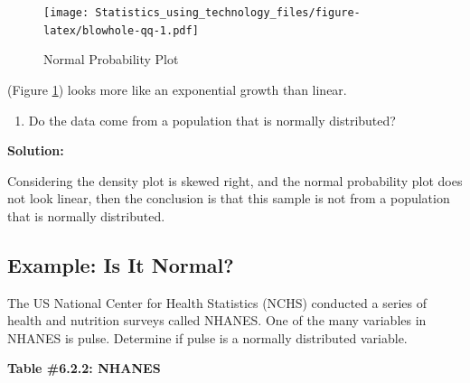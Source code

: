 \documentclass[
]{book}
\providecommand{\tightlist}{%
  \setlength{\itemsep}{0pt}\setlength{\parskip}{0pt}}
\begin{document}
\begin{figure}
\centering
\texttt{[image: Statistics\_using\_technology\_files/figure-latex/blowhole-qq-1.pdf]}
\caption{\label{fig:blowhole-qq}Normal Probability Plot}
\end{figure}

(Figure \ref{fig:blowhole-qq}) looks more like an exponential growth than linear.

\begin{enumerate}
\def\labelenumi{\alph{enumi}.}
\setcounter{enumi}{4}
\tightlist
\item
  Do the data come from a population that is normally distributed?
\end{enumerate}

\textbf{Solution:}

Considering the density plot is skewed right, and the normal probability plot does not look linear, then the conclusion is that this sample is not from a population that is normally distributed.

\hypertarget{example-is-it-normal-1}{%
\subsection{Example: Is It Normal?}\label{example-is-it-normal-1}}

The US National Center for Health Statistics (NCHS) conducted a series of health and nutrition surveys called NHANES. One of the many variables in NHANES is pulse. Determine if pulse is a normally distributed variable.

\textbf{Table \#6.2.2: NHANES}
\end{document}
